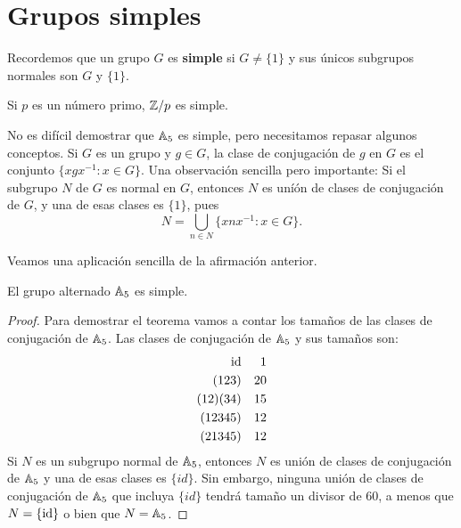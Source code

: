 \chapter{Grupos simples}

Recordemos que un grupo $G$ es \textbf{simple} si $G\ne\{1\}$ y sus únicos subgrupos normales
son $G$ y $\{1\}$.

\begin{example}
Si $p$ es un número primo, $\mathbb{Z}/p$ es simple.
\end{example}

No es difícil demostrar que $\mathbb{A}_5$ es simple, pero necesitamos repasar algunos conceptos. Si $G$ es un grupo y $g\in G$, la clase de conjugación de $g$ en $G$ es el conjunto
$\{xgx^{-1}:x\in G\}$. Una observación sencilla pero importante: Si el subgrupo $N$ de $G$ es normal en $G$, entonces $N$ es uníón de clases de conjugación de $G$, y una de esas clases es $\{1\}$, pues 
\[
N=\bigcup_{n\in N}\{xnx^{-1}:x\in G\}.
\]  



Veamos una aplicación sencilla de la afirmación anterior. 

\begin{proposition}
El grupo alternado $\mathbb{A}_5$ es simple.
\end{proposition}

\begin{proof}
Para demostrar el teorema vamos a contar los tamaños de las clases de conjugación de $\mathbb{A}_5$. Las clases de conjugación de $\mathbb{A}_5$ y sus tamaños son:
\begin{align*}
\operatorname{id} && 1\\
(123) && 20\\
(12)(34) && 15\\
(12345) && 12\\
(21345) && 12
\end{align*}
Si $N$ es un subgrupo normal de $\mathbb{A}_5$, entonces $N$ es unión de clases de conjugación de $\mathbb{A}_5$ y una de esas clases es $\{id\}$. Sin embargo, ninguna unión de clases de conjugación
de $\mathbb{A}_5$ que incluya $\{id\}$ tendrá tamaño un divisor de 60, a menos que $N=\{\operatorname{id}\}$ o bien que  $N=\mathbb{A}_5$.  
\end{proof} 

